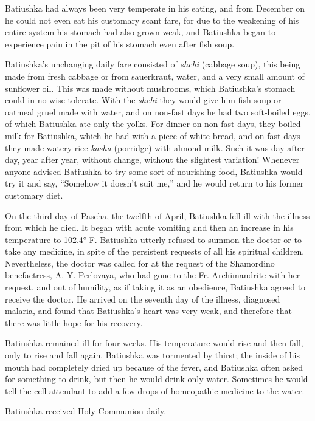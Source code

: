 Batiushka had always been very temperate in his eating, and from December on he could not even eat his customary scant fare, for due to the weakening of his entire system his stomach had also grown weak, and Batiushka began to experience pain in the pit of his stomach even after fish soup.

Batiushka's unchanging daily fare consisted of \textit{shchi} (cabbage soup), this being made from fresh cabbage or from sauerkraut, water, and a very small amount of sunflower oil. This was made without mushrooms, which Batiushka's stomach could in no wise tolerate. With the \textit{shchi} they would give him fish soup or oatmeal gruel made with water, and on non-fast days he had two soft-boiled eggs, of which Batiushka ate only the yolks. For dinner on non-fast days, they boiled milk for Batiushka, which he had with a piece of white bread, and on fast days they made watery rice \textit{kasha} (porridge) with almond milk. Such it was day after day, year after year, without change, without the slightest variation! Whenever anyone advised Batiushka to try some sort of nourishing food, Batiushka would try it and say, “Somehow it doesn't suit me,” and he would return to his former customary diet.

On the third day of Pascha, the twelfth of April, Batiushka fell ill with the illness from which he died. It began with acute vomiting and then an increase in his temperature to 102.4° F. Batiushka utterly refused to summon the doctor or to take any medicine, in spite of the persistent requests of all his spiritual children. Nevertheless, the doctor was called for at the request of the Shamordino benefactress, A. Y. Perlovaya, who had gone to the Fr. Archimandrite with her request, and out of humility, as if taking it as an obedience, Batiushka agreed to receive the doctor. He arrived on the seventh day of the illness, diagnosed malaria, and found that Batiushka's heart was very weak, and therefore that there was little hope for his recovery.

Batiushka remained ill for four weeks. His temperature would rise and then fall, only to rise and fall again. Batiushka was tormented by thirst; the inside of his mouth had completely dried up because of the fever, and Batiushka often asked for something to drink, but then he would drink only water. Sometimes he would tell the cell-attendant to add a few drops of homeopathic medicine to the water.

Batiushka received Holy Communion daily.

